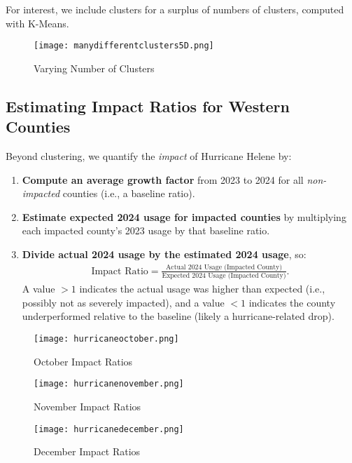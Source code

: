 \documentclass[12pt]{article}
\begin{document}
For interest, we include clusters for a surplus of numbers of clusters, computed with K-Means.

\begin{figure}[H]
    \centering
    \texttt{[image: manydifferentclusters5D.png]}
    \caption{Varying Number of Clusters}
    \label{fig:enter-label}
\end{figure}

\subsection{Estimating Impact Ratios for Western Counties}
\label{subsec:impact_western}
Beyond clustering, we quantify the \emph{impact} of Hurricane Helene by:
\begin{enumerate}
    \item \textbf{Compute an average growth factor} from 2023 to 2024 for all \emph{non-impacted} counties (i.e., a baseline ratio).
    \item \textbf{Estimate expected 2024 usage for impacted counties} by multiplying each impacted county’s 2023 usage by that baseline ratio.
    \item \textbf{Divide actual 2024 usage by the estimated 2024 usage}, so:
    \begin{align}
    \text{Impact Ratio} 
    = \frac{\text{Actual 2024 Usage (Impacted County)}}{\text{Expected 2024 Usage (Impacted County)}}.
    \end{align}
    A value $>1$ indicates the actual usage was higher than expected (i.e., possibly not as severely impacted), and a value $<1$ indicates the county underperformed relative to the baseline (likely a hurricane-related drop).
\end{enumerate}

\begin{figure}[H]
    \centering
    \texttt{[image: hurricaneoctober.png]}
    \caption{October Impact Ratios}
    \label{fig:enter-label}
\end{figure}

\begin{figure}[H]
    \centering
    \texttt{[image: hurricanenovember.png]}
    \caption{November Impact Ratios}
    \label{fig:enter-label}
\end{figure}

\begin{figure}[H]
    \centering
    \texttt{[image: hurricanedecember.png]}
    \caption{December Impact Ratios}
    \label{fig:enter-label}
\end{figure}
\end{document}
